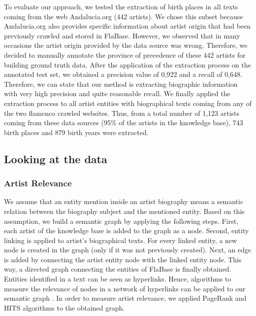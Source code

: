 To evaluate our approach, we tested the extraction of birth places in all texts coming from the web Andalucia.org (442 artists). We chose this subset because Andalucia.org also provides specific information about artist origin that had been previously crawled and stored in FlaBase. However, we observed that in many occasions the artist origin provided by the data source was wrong. Therefore, we decided to manually annotate the province of precedence of these 442 artists for building ground truth data. After the application of the extraction process on the annotated test set, we obtained a precision value of 0,922 and a recall of 0,648. Therefore, we can state that our method is extracting biographic information with very high precision and quite reasonable recall. 
We finally applied the extraction process to all artist entities with biographical texts coming from any of the two flamenco crawled websites. Thus, from a total number of 1,123 artists coming from these data sources (95\% of the artists in the knowledge base), 743 birth places and 879 birth years were extracted. 



\subsection{Looking at the data}\label{sec:musicology:statistics}

\subsubsection{Artist Relevance}

We assume that an entity mention inside an artist biography means a semantic relation between the biography subject and the mentioned entity. Based on this assumption, we build a semantic graph by applying the following steps. First, each artist of the knowledge base is added to the graph as a node. Second, entity linking is applied to artist's biographical texts. For every linked entity, a new node is created in the graph (only if it was not previously created). Next, an edge is added by connecting the artist entity node with the linked entity node. This way, a directed graph connecting the entities of FlaBase is finally obtained. Entities identified in a text can be seen as hyperlinks. Hence, algorithms to measure the relevance of nodes in a network of hyperlinks can be applied to our semantic graph \cite{Bellomi2005}. In order to measure artist relevance, we applied PageRank \cite{Brin1998} and HITS \cite{Kleinberg1999} algorithms to the obtained graph. 

